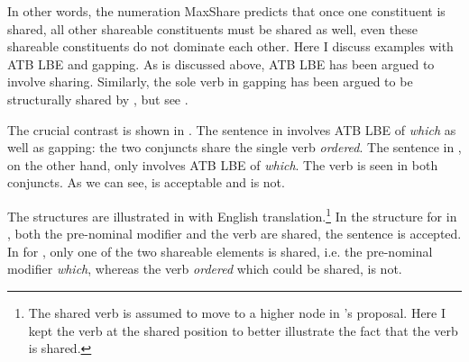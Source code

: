 \documentclass[output=paper]{langscibook}
\begin{document}

In other words, the numeration MaxShare predicts that once one constituent is shared, all other shareable constituents must be shared as well, even these shareable constituents do not dominate each other. Here I discuss examples with ATB LBE and gapping.
As is discussed above, ATB LBE has been argued to involve sharing. 
Similarly, the sole verb in gapping has been argued to be structurally shared by \cite{Citko:2011}, 
but see \cite{Citko:2018}.

 
The crucial contrast is shown in .  
The sentence in  involves ATB LBE of \textit{which} as well as gapping: the two conjuncts share the single verb \textit{ordered}. 
The sentence in , on the other hand, only involves ATB LBE of \textit{which}. The verb is seen in both conjuncts.
As we can see,  is acceptable and  is not. 

\ea 
	\label{shengapAtb}
	\z 
\z 

The structures are illustrated in  with English translation.\footnote{The shared verb is assumed to move to a higher node in \cite{Citko:2011}'s proposal. 
Here I kept the verb at the shared position to better illustrate the fact that the verb is shared.}
In the structure for  in , both the pre-nominal modifier and the verb are shared, the sentence is accepted. 
In  for , only one of the two shareable elements is shared, i.e.  the pre-nominal modifier \textit{which}, whereas the verb \textit{ordered} which could be shared, is not.
\end{document}
